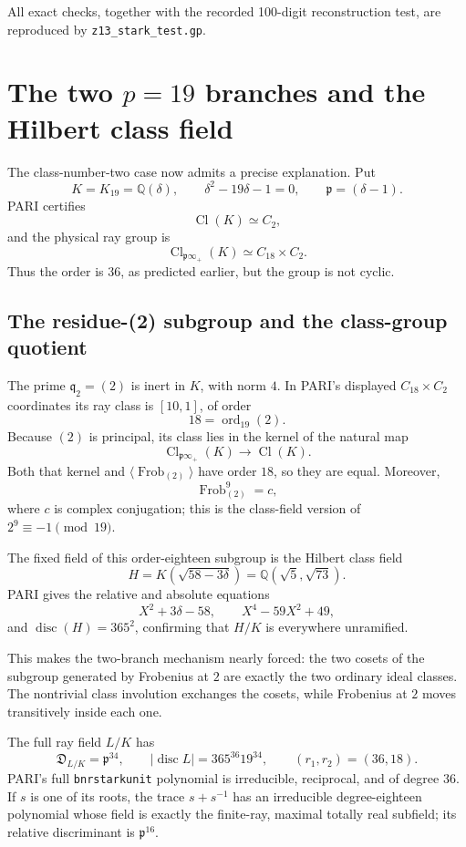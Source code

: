 \documentclass[11pt,reqno]{amsart}
\theoremstyle{plain}
\begin{document}
All exact checks, together with the recorded 100-digit reconstruction test, are reproduced by \texttt{z13\_\allowbreak stark\_\allowbreak test.gp}.

\section{\texorpdfstring{The two \(p=19\) branches and the Hilbert class field}{The two p=19 branches and the Hilbert class field}}\label{sec:26}

The class-number-two case now admits a precise explanation. Put
\[
K=K_{19}=\mathbb Q(\delta),
\qquad
\delta^2-19\delta-1=0,
\qquad
\mathfrak p=(\delta-1).
\]
PARI certifies
\[
\operatorname{Cl}(K)\simeq C_2,
\]
and the physical ray group is
\[
\boxed{
\operatorname{Cl}_{\mathfrak p\infty_+}(K)
\simeq C_{18}\times C_2.
}
\]
Thus the order is \(36\), as predicted earlier, but the group is not cyclic.

\subsection{The residue-(2) subgroup and the class-group quotient}\label{sec:26.1}

The prime \(\mathfrak q_2=(2)\) is inert in \(K\), with norm \(4\). In PARI's displayed \(C_{18}\times C_2\) coordinates its ray class is \([10,1]\), of order
\[
18=\operatorname{ord}_{19}(2).
\]
Because \((2)\) is principal, its class lies in the kernel of the natural map
\[
\operatorname{Cl}_{\mathfrak p\infty_+}(K)
\longrightarrow
\operatorname{Cl}(K).
\]
Both that kernel and \(\langle\operatorname{Frob}_{(2)}\rangle\) have order \(18\), so they are equal. Moreover,
\[
\operatorname{Frob}_{(2)}^9=c,
\]
where \(c\) is complex conjugation; this is the class-field version of \(2^9\equiv-1\pmod {19}\).

The fixed field of this order-eighteen subgroup is the Hilbert class field
\[
H=K\!\left(\sqrt{58-3\delta}\right)
  =\mathbb Q(\sqrt5,\sqrt{73}).
\]
PARI gives the relative and absolute equations
\[
X^2+3\delta-58,
\qquad
X^4-59X^2+49,
\]
and \(\operatorname{disc}(H)=365^2\), confirming that \(H/K\) is everywhere unramified.

This makes the two-branch mechanism nearly forced: the two cosets of the subgroup generated by Frobenius at \(2\) are exactly the two ordinary ideal classes. The nontrivial class involution exchanges the cosets, while Frobenius at \(2\) moves transitively inside each one.

The full ray field \(L/K\) has
\[
\mathfrak D_{L/K}=\mathfrak p^{34},
\qquad
|\operatorname{disc}L|=365^{36}19^{34},
\qquad
(r_1,r_2)=(36,18).
\]
PARI's full \texttt{bnrstarkunit} polynomial is irreducible, reciprocal, and of degree \(36\). If \(s\) is one of its roots, the trace \(s+s^{-1}\) has an irreducible degree-eighteen polynomial whose field is exactly the finite-ray, maximal totally real subfield; its relative discriminant is \(\mathfrak p^{16}\).
\end{document}

